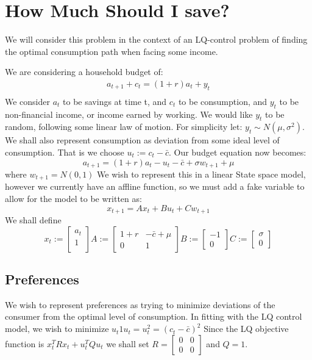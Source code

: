 \documentclass[10pt]{paper}
\begin{document}
\section{How Much Should I save?}

We will consider this problem in the context of an LQ-control problem
of finding the optimal consumption path when facing some income.

We are considering a household budget of:
\begin{align*}
  a_{t+1} + c_t = (1+r)a_t + y_t\\
\end{align*}
We consider $a_t$ to be savings at time t, and $c_t$ to be
consumption, and $y_t$ to be non-financial income, or income earned by
working. We would like $y_t$ to be random, following some linear law
of motion. For simplicity let: $y_t \sim N( \mu , \sigma^2 ) $. We shall also
represent consumption as deviation from some ideal level of
consumption. That is we choose $u_t := c_t - \bar{c}$. Our budget
equation now becomes:
$$a_{t+1} = (1+r)a_t - u_t - \bar{c} + \sigma w_{t+1} + \mu $$
where $w_{t+1} = N(0,1)$ We wish to represent this in a linear State
space model, however we currently have an affline function, so we must
add a fake variable to allow for the model to be written as:
$$x_{t+1} = Ax_t + Bu_t + Cw_{t+1}$$
We shall define
$$x_t :=
\begin{bmatrix}
  a_t\\
  1\\
\end{bmatrix}
A :=
\begin{bmatrix}
  1+r & -\bar{c} + \mu\\
  0 & 1
\end{bmatrix}
 B :=
 \begin{bmatrix}
   -1\\
   0
 \end{bmatrix}
 C :=
 \begin{bmatrix}
   \sigma\\
   0
 \end{bmatrix}
$$

\subsection*{Preferences}

We wish to represent preferences as trying to minimize deviations of
the consumer from the optimal level of consumption. In fitting with
the LQ control model, we wish to minimize $u_t 1 u_t = u_t^2 =
(c_t - \bar{c})^2$ Since the LQ objective function is $x_t^T R x_t +
u_t^T Q u_t$ we shall set $R = \begin{bmatrix} 0 & 0 \\ 0 & 0 \end{bmatrix}$ and $Q = 1$. 
\end{document}
